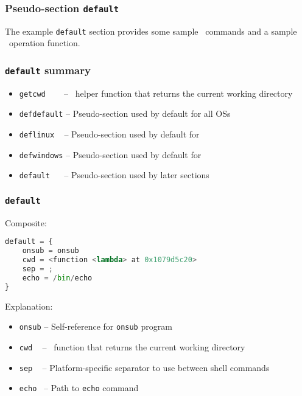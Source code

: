 \subsubsection{Pseudo-section \lstinline{default}}

The example \lstinline{default} section provides some sample \Linux\ commands and a sample \Python\ operation function.

\subsubsection*{\lstinline{default} summary}

\begin{itemize}
\item \lstinline{getcwd} ~~~ -- \Python\ helper function that returns the current working directory
\item \lstinline{defdefault} -- Pseudo-section used by default for all OSs
\item \lstinline{deflinux} ~ -- Pseudo-section used by default for \Linux
\item \lstinline{defwindows} -- Pseudo-section used by default for \Windows
\item \lstinline{default} ~~ -- Pseudo-section used by later sections
\end{itemize}

\subsubsection*{\lstinline{default} \Linux}

Composite:

\begin{snugshade}
\begin{lstlisting}[language=python]
default = {
	onsub = onsub
	cwd = <function <lambda> at 0x1079d5c20>
	sep = ;
	echo = /bin/echo
}
\end{lstlisting}
\end{snugshade}

Explanation:

\begin{itemize}
\item \lstinline{onsub} -- Self-reference for \lstinline{onsub} program
\item \lstinline{cwd} ~ -- \Python\ function that returns the current working directory
\item \lstinline{sep} ~ -- Platform-specific separator to use between shell commands
\item \lstinline{echo}~ -- Path to \lstinline{echo} command
\end{itemize}

